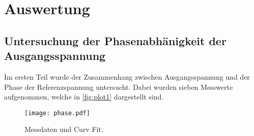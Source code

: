 \section{Auswertung}
\label{sec:Auswertung}

\subsection{Untersuchung der Phasenabhänigkeit der Ausgangsspannung}
\label{sec:Untersuchung der Phasenabhänigkeit der Ausgangsspannung}
Im ersten Teil wurde der Zusammenhang zwischen Ausgangsspannung und der Phase der
Referenzspannung untersucht. Dabei wurden sieben Messwerte aufgenommen, welche in
\autoref{fig:plot1} dargestellt sind.
\begin{figure}
  \centering
  \texttt{[image: phase.pdf]}
  \caption{Messdaten und Curv Fit.}
  \label{fig:plot1}
\end{figure}


